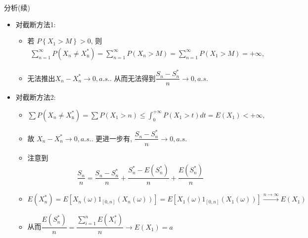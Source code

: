 \begin{frame}{分析(续)}
	\begin{itemize}[<+-|alert@+>]
	\item 对截断方法1:
	\begin{itemize}[<+-|alert@+>]
	\item 若 $P\left\{X_{1}>M\right\} >0$, 则
	\begin{align*}
	   \sum_{n=1}^{\infty} P(X_{n} \neq X_{\mathrm{n}}^{*})=\sum_{n=1}^{\infty} P(X_{n}>M)=\sum_{n=1}^{\infty} P(X_{1}>M) =+\infty,
	\end{align*}
	\item 	无法推出$X_n-X_n^*\rightarrow 0, a.s.$. 从而无法得到$	  \dfrac{S_n-S_n^*}{n}\rightarrow 0, a.s.
	$


	\end{itemize}

	\item 对截断方法2:
	\begin{itemize}[<+-|alert@+>]
	\item $\sum P(X_{n} \neq X_{\mathrm{n}}^{*})=\sum P(X_{1}>n)\leq \int_{0}^{+\infty} P(X_{1}>t) d t=E\left(X_{1}\right)<+\infty,
	$
	\item 故 $X_n-X_n^*\rightarrow 0, a.s.$. 更进一步有, $\dfrac{S_n-S_n^*}{n}\rightarrow 0, a.s.$
	\item 注意到
	\begin{align*}
	  \dfrac{S_n}{n}=\dfrac{S_n-S_n^*}{n}+\dfrac{S_n^*-E(S_n^*)}{n}+\dfrac{E(S_n^*)}{n}
	\end{align*}
    \item $E(X_n^*)=E[X_{n}(\omega) 1_{[0, n]}\left(X_{n}(\omega)\right)]=E[X_{1}(\omega) 1_{[0, n]}\left(X_{1}(\omega)\right)]\stackrel{n\rightarrow \infty}{\longrightarrow} E(X_1)$
    \item 从而$\dfrac{E(S_n^*)}{n}=\dfrac{\sum_{i=1}^nE(X_i^*)}{n}\rightarrow E(X_1)=a$
	\end{itemize}

	\end{itemize}


\end{frame}

